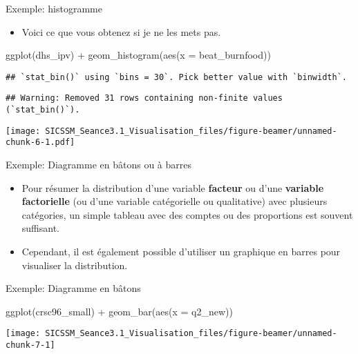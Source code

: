 \documentclass[
  ignorenonframetext,
]{beamer}
\newenvironment{Shaded}{\begin{snugshade}}{\end{snugshade}}
\newcommand{\AttributeTok}[1]{\textcolor[rgb]{0.77,0.63,0.00}{#1}}
\newcommand{\FunctionTok}[1]{\textcolor[rgb]{0.00,0.00,0.00}{#1}}
\newcommand{\NormalTok}[1]{#1}
\newcommand{\SpecialCharTok}[1]{\textcolor[rgb]{0.00,0.00,0.00}{#1}}
\providecommand{\tightlist}{%
  \setlength{\itemsep}{0pt}\setlength{\parskip}{0pt}}
\begin{document}
\begin{frame}[fragile]{Exemple: histogramme}
\protect\hypertarget{exemple-histogramme-3}{}
\begin{itemize}
\tightlist
\item
  Voici ce que vous obtenez si je ne les mets pas.
\end{itemize}

\begin{Shaded}
\begin{Highlighting}[]
\FunctionTok{ggplot}\NormalTok{(dhs\_ipv) }\SpecialCharTok{+}
  \FunctionTok{geom\_histogram}\NormalTok{(}\FunctionTok{aes}\NormalTok{(}\AttributeTok{x =}\NormalTok{ beat\_burnfood))}
\end{Highlighting}
\end{Shaded}

\begin{verbatim}
## `stat_bin()` using `bins = 30`. Pick better value with `binwidth`.
\end{verbatim}

\begin{verbatim}
## Warning: Removed 31 rows containing non-finite values (`stat_bin()`).
\end{verbatim}

\texttt{[image: SICSSM\_Seance3.1\_Visualisation\_files/figure-beamer/unnamed-chunk-6-1.pdf]}
\end{frame}

\begin{frame}{Exemple: Diagramme en bâtons ou à barres}
\protect\hypertarget{exemple-diagramme-en-buxe2tons-ou-uxe0-barres}{}
\begin{itemize}
\tightlist
\item
  Pour résumer la distribution d'une variable \textbf{facteur} ou d'une
  \textbf{variable factorielle} (ou d'une variable catégorielle ou
  qualitative) avec plusieurs catégories, un simple tableau avec des
  comptes ou des proportions est souvent suffisant.
\item
  Cependant, il est également possible d'utiliser un graphique en barres
  pour visualiser la distribution.
\end{itemize}
\end{frame}

\begin{frame}[fragile]{Exemple: Diagramme en bâtons}
\protect\hypertarget{exemple-diagramme-en-buxe2tons}{}
\begin{Shaded}
\begin{Highlighting}[]
\FunctionTok{ggplot}\NormalTok{(crsc96\_small) }\SpecialCharTok{+}
  \FunctionTok{geom\_bar}\NormalTok{(}\FunctionTok{aes}\NormalTok{(}\AttributeTok{x =}\NormalTok{ q2\_new))}
\end{Highlighting}
\end{Shaded}

\begin{center}\texttt{[image: SICSSM\_Seance3.1\_Visualisation\_files/figure-beamer/unnamed-chunk-7-1]} \end{center}
\end{frame}
\end{document}
